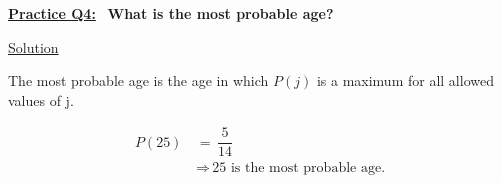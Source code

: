 \underline{\textbf{Practice Q4:}} \ \textbf{What is the most probable age?}

\bigskip

\underline{Solution}

The most probable age is the age in which $P(j)$ is a maximum for all allowed
values of j.

\begin{align*}
    P(25) \, &= \, \dfrac{5}{14} \\[1.5ex]
    &\Rightarrow \, \boxed{\text{25 is the most probable age.}}
\end{align*}